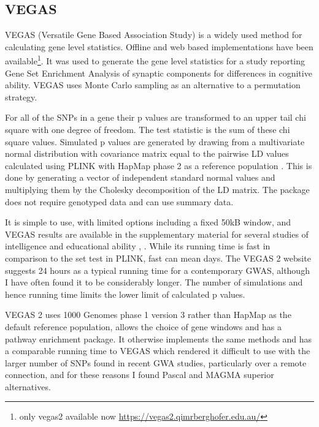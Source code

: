 \subsection{VEGAS}
\label{sec:VEGAS_gene_scores}
VEGAS (Versatile Gene Based Association Study) is a widely used   method for calculating gene level statistics. Offline and web based implementations have been available\footnote{only vegas2 available now \url{https://vegas2.qimrberghofer.edu.au/}}.  It was used  to generate the gene level statistics for a study  reporting Gene Set Enrichment Analysis \cite{subramanian2005gene}  of synaptic components for differences in cognitive ability\cite{hill2014human}. VEGAS uses Monte Carlo sampling as an alternative to a permutation strategy.

For all of the SNPs in a gene their p values are transformed to an upper tail chi square with one degree of freedom. The test statistic is the sum of these chi square values. Simulated p values are generated by drawing from a multivariate normal distribution with covariance matrix equal to the pairwise LD values calculated using PLINK\cite{purcell2007plink} with HapMap phase 2 as a reference population \cite{international2010integrating}. This is done by generating a vector of independent standard normal values and multiplying them by the Cholesky decomposition of the LD matrix. The package does not require genotyped data and can use summary data.

It is simple to use, with limited options including a fixed 50kB window, and VEGAS results are available in the supplementary material for several studies of intelligence and educational ability \cite{davies2011genome}, \cite{hill2014human} \cite{rietveld2013gwas}. While its running time is fast in comparison to the set test in PLINK, fast can mean days. The VEGAS 2 website suggests 24 hours as a typical running time for a contemporary GWAS, although I have often found it to be considerably longer. The number of simulations and hence running time limits the lower limit of calculated p values\cite{lamparter2016fast}.

VEGAS 2 \cite{mishra2015vegas2} uses 1000 Genomes phase 1 version 3 \cite{danecek2011variant} rather than HapMap as the default reference population, allows the choice  of gene windows  and has a pathway enrichment package. It otherwise implements the same methods and has a comparable running time to VEGAS which rendered it difficult to use with the larger number of SNPs found in recent GWA studies, particularly over a remote connection, and for these reasons I found Pascal and MAGMA superior alternatives. %


